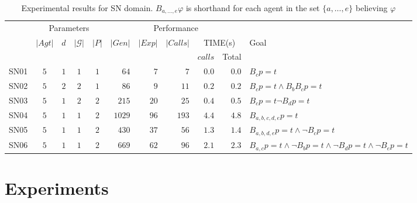 \begin{table*}[ht]
    \centering
    \small
    \addtolength{\tabcolsep}{-1pt}    

        \begin{tabular}{lccccrrrrrl}%
        \toprule
        
        \multirow{3}{*}{}
        & \multicolumn{4}{c}{Parameters} & \multicolumn{5}{c}{Performance} &  \\
         \cmidrule(lr){2-5} \cmidrule(lr){6-10}
        & \multirow{2}{*}{$|Agt|$} & \multirow{2}{*}{$d$} & \multirow{2}{*}{$|\mathcal{G}|$} & \multirow{2}{*}{$|P|$} & \multirow{2}{*}{$|Gen|$} & \multirow{2}{*}{$|Exp|$} & \multirow{2}{*}{$|Calls|$} & \multicolumn{2}{c}{TIME(s)} &\multirow{2}{*}{Goal} \\
        & & & & & & & & {$calls$} & Total & \\
        \midrule
        SN01 & $5$ & $1$ & $1$ & $1$ & $64$   & $7$  & $7$   & $0.0$ & $0.0$ & $B_c p=t$ \\
        SN02 & $5$ & $2$ & $2$ & $1$ & $86$   & $9$  & $11$  & $0.2$ & $0.2$ & $B_c p=t \land B_b B_c p=t$ \\
        SN03 & $5$ & $1$ & $2$ & $2$ & $215$  & $20$ & $25$  & $0.4$ & $0.5$ & $B_c p=t \neg B_d p=t$ \\
        SN04 & $5$ & $1$ & $1$ & $2$ & $1029$ & $96$ & $193$ & $4.4$ & $4.8$ & $B_{a,b,c,d,e} p = t$ \\
        SN05 & $5$ & $1$ & $1$ & $2$ & $430$  & $37$ & $56$  & $1.3$ & $1.4$ & $B_{a,b,d,e} p = t \land \neg B_c p=t$ \\%
        SN06 & $5$ & $1$ & $1$ & $2$ & $669$  & $62$ & $96$  & $2.1$ & $2.3$ & $B_{a,c} p=t \land \neg B_b p=t \land \neg B_d p=t \land \neg B_e p=t $ \\
        \bottomrule
    \end{tabular}
    \caption{Experimental results for SN domain. $B_{a,\ldots,e} \varphi$ is shorthand for each agent in the set $\{a,\ldots,e\}$ believing $\varphi$}
    \label{tab:sn}
\end{table*}{}

\section{Experiments}

